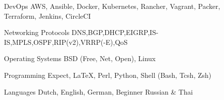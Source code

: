 

\begin{cvskills}

  \cvskill
    {DevOps} %
    {AWS, Ansible, Docker, Kubernetes, Rancher, Vagrant, Packer, Terraform, Jenkins, CircleCI} %

  \cvskill
    {Networking Protocols} %
    {DNS,BGP,DHCP,EIGRP,IS-IS,MPLS,OSPF,RIP(v2),VRRP(-E),QoS} %

  \cvskill
    {Operating Systems} %
	{BSD (Free, Net, Open), Linux} %

  \cvskill
    {Programming} %
	{Expect, LaTeX, Perl, Python, Shell (Bash, Tcsh, Zsh)} %

  \cvskill
    {Languages} %
	{Dutch, English, German, Beginner Russian \& Thai} %

\end{cvskills}
